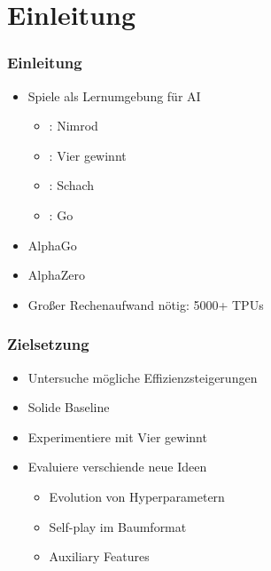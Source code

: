 


\section{Einleitung}



\begin{frame}
 \frametitle{Einleitung}
  


\begin{itemize}
  \item \pause Spiele als Lernumgebung für AI
\begin{itemize}
  \item {}: Nimrod
  \item {}: Vier gewinnt
  \item {}: Schach
  \item {}: Go
\end{itemize}
\end{itemize}

\begin{itemize}
  \item \pause AlphaGo
  \item \pause AlphaZero
  \item \pause Großer Rechenaufwand nötig: 5000+ TPUs
\end{itemize}

  
\end{frame}
\begin{frame}
 \frametitle{Zielsetzung}
  


\begin{itemize}
  \item \pause Untersuche mögliche Effizienzsteigerungen
  \item \pause Solide Baseline
  \item \pause Experimentiere mit Vier gewinnt
  \item \pause Evaluiere verschiende neue Ideen
\begin{itemize}
  \item \pause Evolution von Hyperparametern
  \item \pause Self-play im Baumformat
  \item \pause Auxiliary Features
\end{itemize}
\end{itemize}

  
\end{frame}

